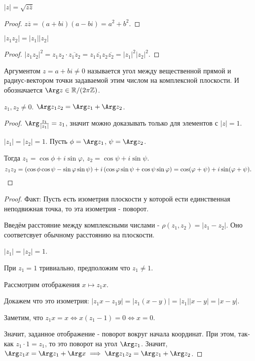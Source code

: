 \begin{statement} 
    $|z| = \sqrt{z \overline{z}} $ 
    \begin{proof} $z \overline{z} = (a+bi)(a-bi) = a^2+b^2$. \end{proof}
\end{statement}
\begin{statement} 
    $|z_1z_2| = |z_1| |z_2|$
    \begin{proof}
        $|z_1 z_2|^2 = z_1z_2 \cdot \overline{z_1 z_2} = z_1 \overline{z_1} z_2 \overline{z_2} = |z_1|^2|z_2|^2 $. \end{proof}
\end{statement}
\begin{definition} 
    Аргументом $z = a+bi \neq 0$ называется угол между вещественной прямой и радиус-вектором точки задаваемой этим числом на комплексной плоскости. И обозначается $\Arg z \in \mathbb{R}/(2\pi \mathbb{Z})$.
\end{definition}
\begin{statement} 
    $z_1, z_2 \neq 0$. $\Arg z_1z_2 = \Arg z_1 + \Arg z_2$.
    \begin{proof}
        $\Arg \frac{z_1}{|z_1|} = z_1$, значит можно доказывать только для элементов с $|z|=1$.

        $|z_1|=|z_2|=1$. Пусть $\phi = \Arg z_1$, $\psi = \Arg z_2$. 

        Тогда $z_1 =\cos \phi + i\sin \varphi$, $z_2 =\cos \psi + i\sin \psi$.
        \[ z_1z_2 = (\cos \phi \cos \psi -\sin \varphi\sin \psi) + i\left(\cos \varphi\sin \psi +\cos \psi\sin \varphi \right) =\cos (\varphi + \psi) + i\sin(\varphi + \psi)  .\qedhere\] 
    \end{proof}
    \begin{proof}
       Факт: Пусть есть изометрия плоскости у которой ести единственная неподвижная точка, то эта изометрия - поворот.

       Введём расстояние между комплексными числами - $\rho(z_1, z_2) = |z_1-z_2|$. Оно соответсвует обычному расстоянию на плоскости.

       $|z_1| = |z_2| = 1$.

       При $z_1 = 1$ тривиально, предположим что $z_1 \neq 1$.

       Рассмотрим отображения $x \mapsto z_1 x$.

       Докажем что это изометрия: $|z_1 x - z_1 y| = |z_1(x-y)| = |z_1| |x-y| = |x-y|$.

       Заметим, что $z_1 x = x \iff x(z_1-1) = 0 \iff x = 0$.

       Значит, заданное отображение - поворот вокруг начала координат. При этом, так-как $z_1 \cdot  1 = z_1$, то это поворот на угол $\Arg z_1$. Значит, $\Arg z_1 x = \Arg z_1 + \Arg x \implies \Arg z_1 z_2 = \Arg z_1 + \Arg z_2$.
    \end{proof}
\end{statement}
